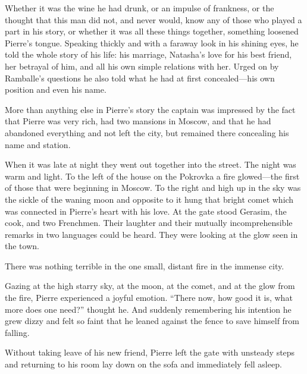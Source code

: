 Whether it was the wine he had drunk, or an impulse of frankness,
or the thought that this man did not, and never would, know any
of those who played a part in his story, or whether it was all
these things together, something loosened Pierre's
tongue. Speaking thickly and with a faraway look in his shining
eyes, he told the whole story of his life: his marriage,
Natasha's love for his best friend, her betrayal of him, and all
his own simple relations with her. Urged on by Ramballe's
questions he also told what he had at first concealed---his own
position and even his name.

More than anything else in Pierre's story the captain was
impressed by the fact that Pierre was very rich, had two mansions
in Moscow, and that he had abandoned everything and not left the
city, but remained there concealing his name and station.

When it was late at night they went out together into the
street. The night was warm and light. To the left of the house on
the Pokrovka a fire glowed---the first of those that were
beginning in Moscow. To the right and high up in the sky was the
sickle of the waning moon and opposite to it hung that bright
comet which was connected in Pierre's heart with his love. At the
gate stood Gerasim, the cook, and two Frenchmen. Their laughter
and their mutually incomprehensible remarks in two languages
could be heard. They were looking at the glow seen in the town.

There was nothing terrible in the one small, distant fire in the
immense city.

Gazing at the high starry sky, at the moon, at the comet, and at
the glow from the fire, Pierre experienced a joyful
emotion. ``There now, how good it is, what more does one need?''
thought he. And suddenly remembering his intention he grew dizzy
and felt so faint that he leaned against the fence to save
himself from falling.

Without taking leave of his new friend, Pierre left the gate with
unsteady steps and returning to his room lay down on the sofa and
immediately fell asleep.


